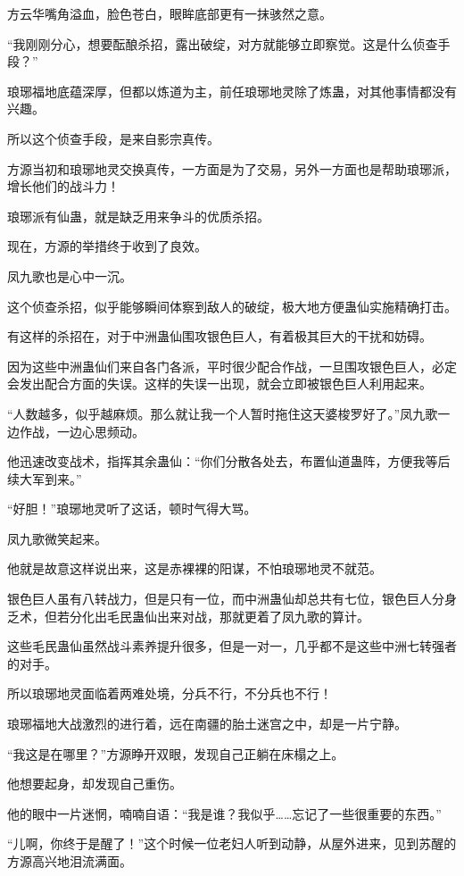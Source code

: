 \begin{this_body}
方云华嘴角溢血，脸色苍白，眼眸底部更有一抹骇然之意。

“我刚刚分心，想要酝酿杀招，露出破绽，对方就能够立即察觉。这是什么侦查手段？”

琅琊福地底蕴深厚，但都以炼道为主，前任琅琊地灵除了炼蛊，对其他事情都没有兴趣。

所以这个侦查手段，是来自影宗真传。

方源当初和琅琊地灵交换真传，一方面是为了交易，另外一方面也是帮助琅琊派，增长他们的战斗力！

琅琊派有仙蛊，就是缺乏用来争斗的优质杀招。

现在，方源的举措终于收到了良效。

凤九歌也是心中一沉。

这个侦查杀招，似乎能够瞬间体察到敌人的破绽，极大地方便蛊仙实施精确打击。

有这样的杀招在，对于中洲蛊仙围攻银色巨人，有着极其巨大的干扰和妨碍。

因为这些中洲蛊仙们来自各门各派，平时很少配合作战，一旦围攻银色巨人，必定会发出配合方面的失误。这样的失误一出现，就会立即被银色巨人利用起来。

“人数越多，似乎越麻烦。那么就让我一个人暂时拖住这天婆梭罗好了。”凤九歌一边作战，一边心思频动。

他迅速改变战术，指挥其余蛊仙：“你们分散各处去，布置仙道蛊阵，方便我等后续大军到来。”

“好胆！”琅琊地灵听了这话，顿时气得大骂。

凤九歌微笑起来。

他就是故意这样说出来，这是赤裸裸的阳谋，不怕琅琊地灵不就范。

银色巨人虽有八转战力，但是只有一位，而中洲蛊仙却总共有七位，银色巨人分身乏术，但若分化出毛民蛊仙出来对战，那就更着了凤九歌的算计。

这些毛民蛊仙虽然战斗素养提升很多，但是一对一，几乎都不是这些中洲七转强者的对手。

所以琅琊地灵面临着两难处境，分兵不行，不分兵也不行！

琅琊福地大战激烈的进行着，远在南疆的胎土迷宫之中，却是一片宁静。

“我这是在哪里？”方源睁开双眼，发现自己正躺在床榻之上。

他想要起身，却发现自己重伤。

他的眼中一片迷惘，喃喃自语：“我是谁？我似乎……忘记了一些很重要的东西。”

“儿啊，你终于是醒了！”这个时候一位老妇人听到动静，从屋外进来，见到苏醒的方源高兴地泪流满面。


\end{this_body}

